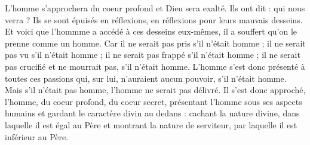 L'homme s'approchera du coeur profond et Dieu sera exalté. Ils ont dit : qui nous verra ? Ils se sont épuisés en réflexions, en réflexions pour leurs mauvais desseins. Et voici que l'hommme a accédé à ces desseins eux-mêmes, il a souffert qu'on le prenne comme un homme. Car il ne serait pas pris s'il n'était homme ; il ne serait pas vu s'il n'était homme ; il ne serait pas frappé s'il n'était homme ; il ne serait pas crucifié et ne mourrait pas, s'il n'était homme. L'homme s'est donc présenté à toutes ces passions qui, sur lui, n'auraient aucun pouvoir, s'il n'était homme. Mais s'il n'était pas homme, l'homme ne serait pas délivré. Il s'est donc approché, l'homme, du coeur profond, du coeur secret, présentant l'homme sous ses aspects humains et gardant le caractère divin au dedans : cachant la nature divine, dans laquelle il est égal au Père et montrant la nature de serviteur, par laquelle il est inférieur au Père.